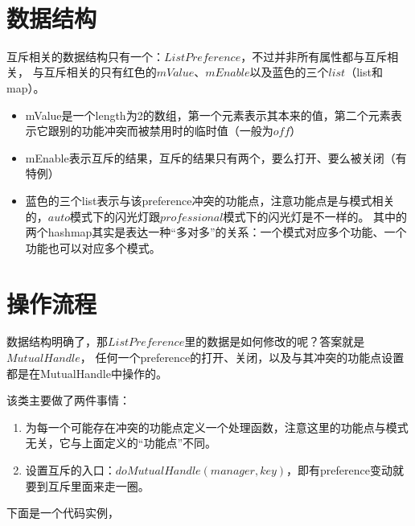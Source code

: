 \documentclass[a4paper,11pt]{article}
\begin{document}
\tt %
\pagestyle{header}
\sybmaketitle
\tableofcontents
\newpage

\pagestyle{main}
\setcounter{page}{1}

\part[数据结构]{数据结构}
互斥相关的数据结构只有一个：$ListPreference$，不过并非所有属性都与互斥相关，
与互斥相关的只有红色的$mValue$、$mEnable$以及蓝色的三个$list$（list和map）。
\vspace{2em}



\vspace{2em}
\begin{itemize}
  \item mValue是一个length为2的数组，第一个元素表示其本来的值，第二个元素表示它跟别的功能冲突而被禁用时的临时值（一般为$off$）
  \item mEnable表示互斥的结果，互斥的结果只有两个，要么打开、要么被关闭（有特例）
  \item 蓝色的三个list表示与该preference冲突的功能点，注意功能点是与模式相关的，$auto$模式下的闪光灯跟$professional$模式下的闪光灯是不一样的。
        其中的两个hashmap其实是表达一种“多对多”的关系：一个模式对应多个功能、一个功能也可以对应多个模式。
\end{itemize}


\part[操作流程]{操作流程}
数据结构明确了，那$ListPreference$里的数据是如何修改的呢？答案就是$MutualHandle$，
任何一个preference的打开、关闭，以及与其冲突的功能点设置都是在MutualHandle中操作的。

该类主要做了两件事情：
\begin{enumerate}
  \item 为每一个可能存在冲突的功能点定义一个处理函数，注意这里的功能点与模式无关，它与上面定义的“功能点”不同。
  \item 设置互斥的入口：$doMutualHandle(manager, key)$，即有preference变动就要到互斥里面来走一圈。
\end{enumerate}

下面是一个代码实例，
\end{document}
